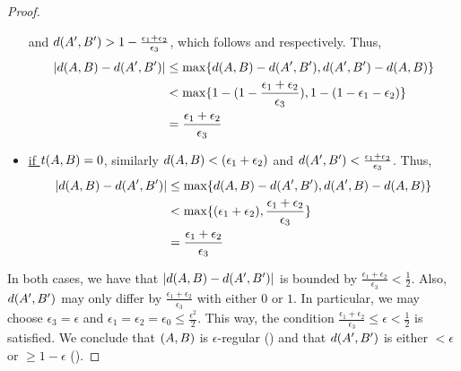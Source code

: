 \begin{lemma}[Lemma 5.17]
\begin{proof}
\begin{itemize}
                    and $d ( A',B' ) > 1 - \frac{\epsilon_1 + \epsilon_2}{\epsilon_3}$, which follows
                     and
                     respectively.
                    Thus,
                    \begin{align*}
                        | d ( A,B ) - d ( A',B' ) |
                            & \leq \max \{ d ( A,B ) - d ( A',B' ), d ( A',B' ) - d ( A,B ) \} \\
                            & < \max \{  1 - ( 1 - \frac{\epsilon_1 + \epsilon_2}{\epsilon_3} ),
                                1 - ( 1 - \epsilon_1 - \epsilon_2 ) \} \\
                            & = \frac{\epsilon_1 + \epsilon_2}{\epsilon_3}
                    \end{align*}
                \item \underline{if $t( A,B ) = 0$}, similarly $d( A,B ) < ( \epsilon_1 + \epsilon_2 )$
                    and $d ( A',B' ) < \frac{\epsilon_1 + \epsilon_2}{\epsilon_3}$.
                    Thus,
                    \begin{align*}
                        | d ( A,B ) - d ( A',B' ) |
                            & \leq \max \{ d ( A,B ) - d ( A',B' ), d ( A',B ) - d ( A,B ) \} \\
                            & < \max \{ ( \epsilon_1 + \epsilon_2 ), \frac{\epsilon_1 + \epsilon_2}{\epsilon_3} \} \\
                            & = \frac{\epsilon_1 + \epsilon_2}{\epsilon_3}
                    \end{align*}
            \end{itemize}
            In both cases, we have that $| d ( A,B ) - d ( A',B' ) |$ is bounded by
            $\frac{\epsilon_1 + \epsilon_2}{\epsilon_3} < \frac{1}{2}$.
            Also, $d ( A', B' )$ may only differ by $\frac{\epsilon_1 + \epsilon_2}{\epsilon_3}$ with either
            $0$ or $1$.
            In particular, we may choose $\epsilon_3 = \epsilon$ and $\epsilon_1 = \epsilon_2 = \epsilon_0 \leq \frac{\epsilon^2}{2}$.
            This way, the condition $\frac{\epsilon_1 + \epsilon_2}{\epsilon_3} \leq \epsilon < \frac{1}{2}$ is satisfied.
            We conclude that $( A,B )$ is $\epsilon$-regular () and that $d ( A',B' )$ is either
            $< \epsilon$ or $\geq 1 - \epsilon$ ().
        \end{proof}
    \end{lemma}

